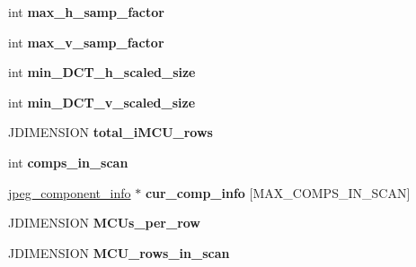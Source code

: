 \begin{DoxyCompactItemize}
\item 
\hypertarget{structjpeg__compress__struct_ae8de4e6079b80e3a81135d07934c640d}{int {\bfseries max\-\_\-h\-\_\-samp\-\_\-factor}}\label{structjpeg__compress__struct_ae8de4e6079b80e3a81135d07934c640d}

\item 
\hypertarget{structjpeg__compress__struct_a9e03a4eb7af87c682937caed3d341d4a}{int {\bfseries max\-\_\-v\-\_\-samp\-\_\-factor}}\label{structjpeg__compress__struct_a9e03a4eb7af87c682937caed3d341d4a}

\item 
\hypertarget{structjpeg__compress__struct_a99a75ca2f7569dcb4444e7cb35ce916f}{int {\bfseries min\-\_\-\-D\-C\-T\-\_\-h\-\_\-scaled\-\_\-size}}\label{structjpeg__compress__struct_a99a75ca2f7569dcb4444e7cb35ce916f}

\item 
\hypertarget{structjpeg__compress__struct_a5d63d182b17f0885fcabf88c6a08a9a5}{int {\bfseries min\-\_\-\-D\-C\-T\-\_\-v\-\_\-scaled\-\_\-size}}\label{structjpeg__compress__struct_a5d63d182b17f0885fcabf88c6a08a9a5}

\item 
\hypertarget{structjpeg__compress__struct_aef01162f4c66434929f933a40e695f9e}{J\-D\-I\-M\-E\-N\-S\-I\-O\-N {\bfseries total\-\_\-i\-M\-C\-U\-\_\-rows}}\label{structjpeg__compress__struct_aef01162f4c66434929f933a40e695f9e}

\item 
\hypertarget{structjpeg__compress__struct_a3387358088abbec1c8838499966c8f06}{int {\bfseries comps\-\_\-in\-\_\-scan}}\label{structjpeg__compress__struct_a3387358088abbec1c8838499966c8f06}

\item 
\hypertarget{structjpeg__compress__struct_af44e10655b0d040e79a2d639dec7d000}{\hyperlink{structjpeg__component__info}{jpeg\-\_\-component\-\_\-info} $\ast$ {\bfseries cur\-\_\-comp\-\_\-info} \mbox{[}M\-A\-X\-\_\-\-C\-O\-M\-P\-S\-\_\-\-I\-N\-\_\-\-S\-C\-A\-N\mbox{]}}\label{structjpeg__compress__struct_af44e10655b0d040e79a2d639dec7d000}

\item 
\hypertarget{structjpeg__compress__struct_a97f0c5e0ae932d1810007077443da684}{J\-D\-I\-M\-E\-N\-S\-I\-O\-N {\bfseries M\-C\-Us\-\_\-per\-\_\-row}}\label{structjpeg__compress__struct_a97f0c5e0ae932d1810007077443da684}

\item 
\hypertarget{structjpeg__compress__struct_ab605396740a26114095bf99c7c7349fb}{J\-D\-I\-M\-E\-N\-S\-I\-O\-N {\bfseries M\-C\-U\-\_\-rows\-\_\-in\-\_\-scan}}\label{structjpeg__compress__struct_ab605396740a26114095bf99c7c7349fb}


\end{DoxyCompactItemize}
